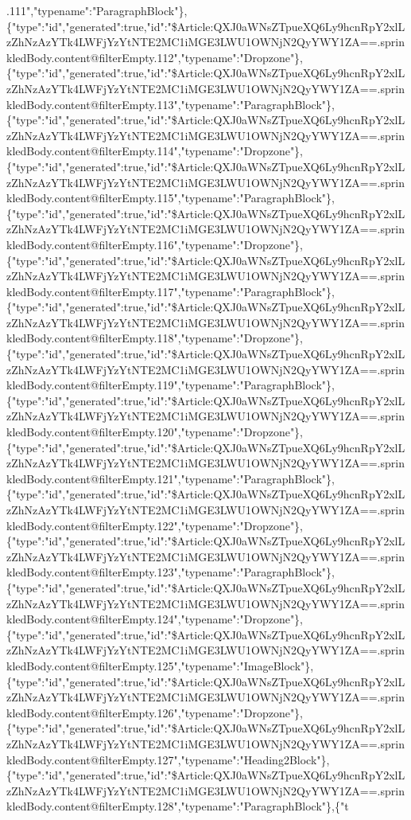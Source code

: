 .111","typename":"ParagraphBlock"\},\{"type":"id","generated":true,"id":"\$Article:QXJ0aWNsZTpueXQ6Ly9hcnRpY2xlLzZhNzAzYTk4LWFjYzYtNTE2MC1iMGE3LWU1OWNjN2QyYWY1ZA==.sprinkledBody.content@filterEmpty.112","typename":"Dropzone"\},\{"type":"id","generated":true,"id":"\$Article:QXJ0aWNsZTpueXQ6Ly9hcnRpY2xlLzZhNzAzYTk4LWFjYzYtNTE2MC1iMGE3LWU1OWNjN2QyYWY1ZA==.sprinkledBody.content@filterEmpty.113","typename":"ParagraphBlock"\},\{"type":"id","generated":true,"id":"\$Article:QXJ0aWNsZTpueXQ6Ly9hcnRpY2xlLzZhNzAzYTk4LWFjYzYtNTE2MC1iMGE3LWU1OWNjN2QyYWY1ZA==.sprinkledBody.content@filterEmpty.114","typename":"Dropzone"\},\{"type":"id","generated":true,"id":"\$Article:QXJ0aWNsZTpueXQ6Ly9hcnRpY2xlLzZhNzAzYTk4LWFjYzYtNTE2MC1iMGE3LWU1OWNjN2QyYWY1ZA==.sprinkledBody.content@filterEmpty.115","typename":"ParagraphBlock"\},\{"type":"id","generated":true,"id":"\$Article:QXJ0aWNsZTpueXQ6Ly9hcnRpY2xlLzZhNzAzYTk4LWFjYzYtNTE2MC1iMGE3LWU1OWNjN2QyYWY1ZA==.sprinkledBody.content@filterEmpty.116","typename":"Dropzone"\},\{"type":"id","generated":true,"id":"\$Article:QXJ0aWNsZTpueXQ6Ly9hcnRpY2xlLzZhNzAzYTk4LWFjYzYtNTE2MC1iMGE3LWU1OWNjN2QyYWY1ZA==.sprinkledBody.content@filterEmpty.117","typename":"ParagraphBlock"\},\{"type":"id","generated":true,"id":"\$Article:QXJ0aWNsZTpueXQ6Ly9hcnRpY2xlLzZhNzAzYTk4LWFjYzYtNTE2MC1iMGE3LWU1OWNjN2QyYWY1ZA==.sprinkledBody.content@filterEmpty.118","typename":"Dropzone"\},\{"type":"id","generated":true,"id":"\$Article:QXJ0aWNsZTpueXQ6Ly9hcnRpY2xlLzZhNzAzYTk4LWFjYzYtNTE2MC1iMGE3LWU1OWNjN2QyYWY1ZA==.sprinkledBody.content@filterEmpty.119","typename":"ParagraphBlock"\},\{"type":"id","generated":true,"id":"\$Article:QXJ0aWNsZTpueXQ6Ly9hcnRpY2xlLzZhNzAzYTk4LWFjYzYtNTE2MC1iMGE3LWU1OWNjN2QyYWY1ZA==.sprinkledBody.content@filterEmpty.120","typename":"Dropzone"\},\{"type":"id","generated":true,"id":"\$Article:QXJ0aWNsZTpueXQ6Ly9hcnRpY2xlLzZhNzAzYTk4LWFjYzYtNTE2MC1iMGE3LWU1OWNjN2QyYWY1ZA==.sprinkledBody.content@filterEmpty.121","typename":"ParagraphBlock"\},\{"type":"id","generated":true,"id":"\$Article:QXJ0aWNsZTpueXQ6Ly9hcnRpY2xlLzZhNzAzYTk4LWFjYzYtNTE2MC1iMGE3LWU1OWNjN2QyYWY1ZA==.sprinkledBody.content@filterEmpty.122","typename":"Dropzone"\},\{"type":"id","generated":true,"id":"\$Article:QXJ0aWNsZTpueXQ6Ly9hcnRpY2xlLzZhNzAzYTk4LWFjYzYtNTE2MC1iMGE3LWU1OWNjN2QyYWY1ZA==.sprinkledBody.content@filterEmpty.123","typename":"ParagraphBlock"\},\{"type":"id","generated":true,"id":"\$Article:QXJ0aWNsZTpueXQ6Ly9hcnRpY2xlLzZhNzAzYTk4LWFjYzYtNTE2MC1iMGE3LWU1OWNjN2QyYWY1ZA==.sprinkledBody.content@filterEmpty.124","typename":"Dropzone"\},\{"type":"id","generated":true,"id":"\$Article:QXJ0aWNsZTpueXQ6Ly9hcnRpY2xlLzZhNzAzYTk4LWFjYzYtNTE2MC1iMGE3LWU1OWNjN2QyYWY1ZA==.sprinkledBody.content@filterEmpty.125","typename":"ImageBlock"\},\{"type":"id","generated":true,"id":"\$Article:QXJ0aWNsZTpueXQ6Ly9hcnRpY2xlLzZhNzAzYTk4LWFjYzYtNTE2MC1iMGE3LWU1OWNjN2QyYWY1ZA==.sprinkledBody.content@filterEmpty.126","typename":"Dropzone"\},\{"type":"id","generated":true,"id":"\$Article:QXJ0aWNsZTpueXQ6Ly9hcnRpY2xlLzZhNzAzYTk4LWFjYzYtNTE2MC1iMGE3LWU1OWNjN2QyYWY1ZA==.sprinkledBody.content@filterEmpty.127","typename":"Heading2Block"\},\{"type":"id","generated":true,"id":"\$Article:QXJ0aWNsZTpueXQ6Ly9hcnRpY2xlLzZhNzAzYTk4LWFjYzYtNTE2MC1iMGE3LWU1OWNjN2QyYWY1ZA==.sprinkledBody.content@filterEmpty.128","typename":"ParagraphBlock"\},\{"t